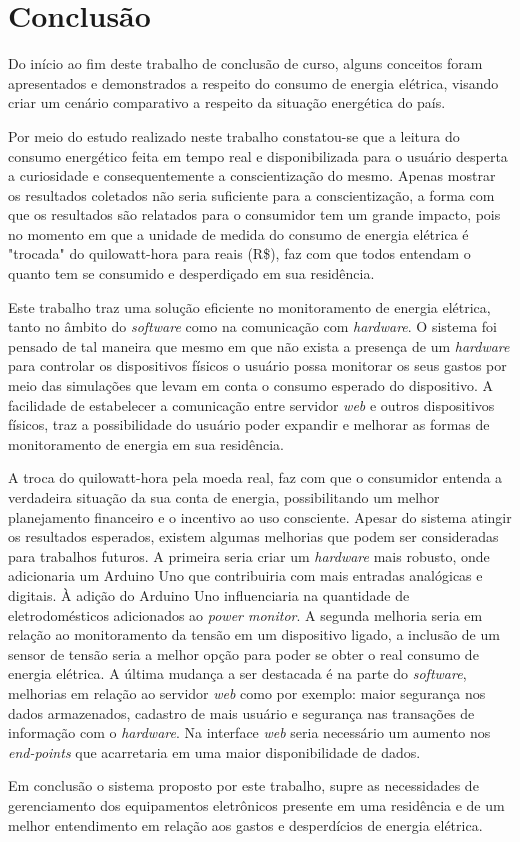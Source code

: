 \chapter[Conclusão]{Conclusão}
\label{ch:conclusao-cap}

Do início ao fim deste trabalho de conclusão de curso, alguns conceitos foram apresentados
e demonstrados a respeito do consumo de energia elétrica, visando criar um cenário
comparativo a respeito da situação energética do país.

Por meio do estudo realizado neste trabalho constatou-se que a leitura do
consumo energético feita em tempo real e disponibilizada para o usuário  
desperta a curiosidade e consequentemente a conscientização do mesmo. Apenas mostrar os resultados coletados não seria suficiente
para a conscientização, a forma com que os resultados são relatados para o consumidor tem um grande impacto, pois
no momento em que a unidade de medida do consumo de energia elétrica é "trocada" do quilowatt-hora para reais (R\$), 
faz com que todos entendam o quanto tem se consumido e desperdiçado em sua residência.

Este trabalho traz uma solução eficiente no monitoramento de energia elétrica, tanto no âmbito do \textit{software} como na comunicação com 
\textit{hardware}. O sistema foi pensado de tal maneira que mesmo em que não exista a presença de um \textit{hardware} para controlar os dispositivos físicos
o usuário possa monitorar os seus gastos por meio das simulações que levam em conta o consumo esperado do dispositivo. A facilidade de estabelecer 
a comunicação entre servidor \textit{web} e outros dispositivos físicos, traz a possibilidade do usuário poder expandir e melhorar as formas
de monitoramento de energia em sua residência.

A troca do quilowatt-hora pela moeda real, faz com que o consumidor entenda a verdadeira situação da sua conta de energia, possibilitando um melhor planejamento
financeiro e o incentivo ao uso consciente. Apesar do sistema atingir os resultados esperados, existem algumas melhorias 
que podem ser consideradas para trabalhos futuros. A primeira seria criar um \textit{hardware} mais robusto, onde adicionaria um Arduino Uno
que contribuiria com mais entradas analógicas e digitais. À adição do Arduino Uno influenciaria na quantidade de eletrodomésticos adicionados 
ao \textit{power monitor}. A segunda melhoria seria em relação ao monitoramento da tensão em um dispositivo ligado, a inclusão de um sensor de tensão 
seria a melhor opção para poder se obter o real consumo de energia elétrica. A última mudança a ser destacada é na parte do 
\textit{software}, melhorias em relação ao servidor \textit{web} como por exemplo: maior segurança nos dados armazenados, cadastro
de mais usuário e segurança nas transações de informação com o \textit{hardware}. Na interface \textit{web} seria necessário um aumento nos \textit{end-points}
que acarretaria em uma maior disponibilidade de dados.

Em conclusão o sistema proposto por este trabalho, supre as necessidades de gerenciamento dos equipamentos eletrônicos
presente em uma residência e de um melhor entendimento em relação aos gastos e desperdícios de energia elétrica.
